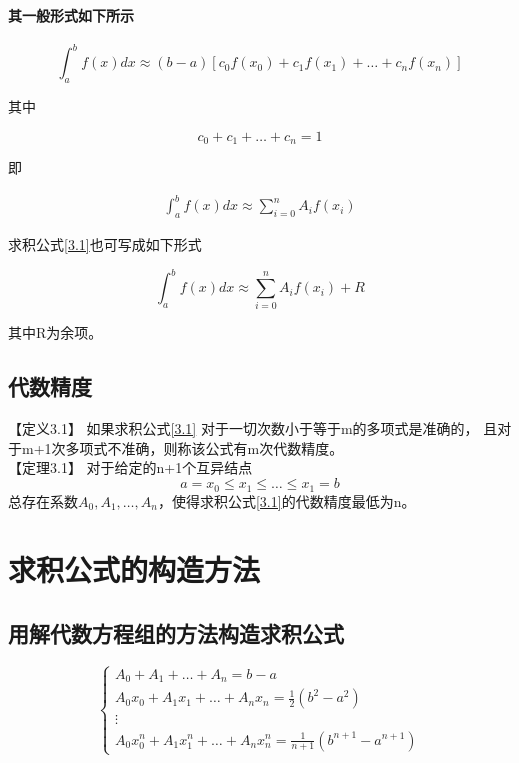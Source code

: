 \documentclass[12pt]{report}
\begin{document}
\paragraph{其一般形式如下所示}

\[
	\int_{a}^{b} f(x) dx \approx (b - a) \left[c_0 f(x_0) + c_1 f(x_1) + \ldots + c_n f(x_n)\right]
\]

其中

\[
	c_0 + c_1 + \ldots + c_n = 1
\]

即

\begin{equation}
	\begin{aligned}
		\int_{a}^{b} f(x) dx \approx \sum_{i=0}^{n} A_i f(x_i)
	\end{aligned}
	\tag{3.1} \label{3.1}
\end{equation}

求积公式\eqref{3.1}也可写成如下形式

\begin{equation}
	\int_{a}^{b} f(x) dx \approx \sum_{i=0}^{n} A_i f(x_i) + R
	\tag{3.2} \label{3.2}
\end{equation}

其中R为余项。

\subsection{代数精度}

【定义3.1】 \quad 如果求积公式\eqref{3.1} 对于一切次数小于等于m的多项式是准确的，
且对于m+1次多项式不准确，则称该公式有m次代数精度。\\

【定理3.1】 \quad 对于给定的n+1个互异结点
\[
	a = x_0 \le x_1 \le \dots \le x_1 = b
\]
总存在系数$A_0 , A_1 , \ldots , A_n$，使得求积公式\eqref{3.1}的代数精度最低为n。


\section{求积公式的构造方法}

\subsection{用解代数方程组的方法构造求积公式}

\begin{equation}
	\begin{cases}
		A_0 + A_1 + \ldots + A_n = b - a \\
		A_0 x_0 + A_1 x_1 + \ldots + A_n x_n = \frac{1}{2} \left(b^2 - a^2\right) \\
		\vdots \\
		A_0 x_{0}^{n} + A_1 x_{1}^{n} + \ldots + A_n x_{n}^{n} = \frac{1}{n + 1} \left(b^{n+1} - a^{n+1}\right)
	\end{cases}
	\tag{3.3} \label{3.3}
\end{equation}
\end{document}
